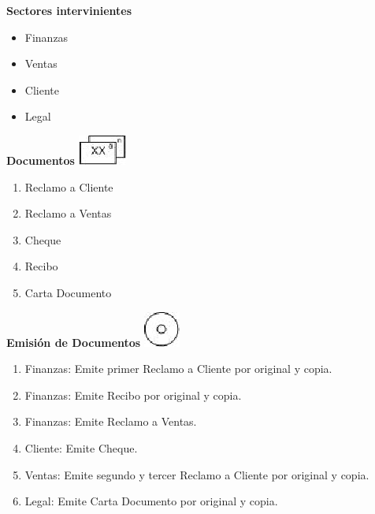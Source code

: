 \begin{center}\textbf{Sectores intervinientes}\end{center}
\begin{itemize}
  \item Finanzas
  \item Ventas
  \item Cliente
  \item Legal
\end{itemize}

\begin{center}
  \textbf{Documentos}
  \includegraphics{../../../Images/Simbolos/simbolo-Documentos.png}
\end{center}
\begin{enumerate}
\item Reclamo a Cliente
\item Reclamo a Ventas
\item Cheque
\item Recibo
\item Carta Documento
\end{enumerate}

\begin{center}
  \textbf{Emisión de Documentos}
  \includegraphics{../../../Images/Simbolos/simbolo-Emision-de-Documentos.png}
\end{center}
\begin{enumerate}
\item Finanzas: Emite primer Reclamo a Cliente por original y copia.
\item Finanzas: Emite Recibo por original y copia.
\item Finanzas: Emite Reclamo a Ventas.
\item Cliente: Emite Cheque.
\item Ventas: Emite segundo y tercer Reclamo a Cliente por original y copia.
\item Legal: Emite Carta Documento por original y copia.
\end{enumerate}

